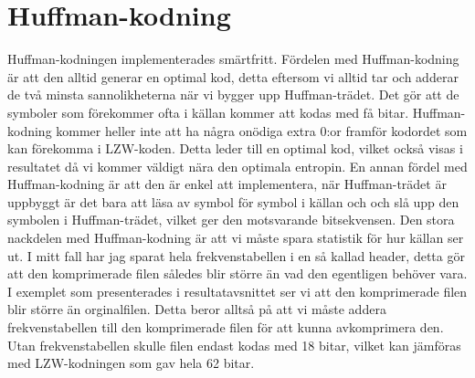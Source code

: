 \section{Huffman-kodning}
Huffman-kodningen implementerades smärtfritt. Fördelen med Huffman-kodning är att den alltid generar en optimal kod, detta eftersom vi alltid tar och adderar de två minsta sannolikheterna när vi bygger upp Huffman-trädet. Det gör att de symboler som förekommer ofta i källan kommer att kodas med få bitar. Huffman-kodning kommer heller inte att ha några onödiga extra 0:or framför kodordet som kan förekomma i LZW-koden. Detta leder till en optimal kod, vilket också visas i resultatet då vi kommer väldigt nära den optimala entropin. En annan fördel med Huffman-kodning är att den är enkel att implementera, när Huffman-trädet är uppbyggt är det bara att läsa av symbol för symbol i källan och och slå upp den symbolen i Huffman-trädet, vilket ger den motsvarande bitsekvensen.
Den stora nackdelen med Huffman-kodning är att vi måste spara statistik för hur källan ser ut. I mitt fall har jag sparat hela frekvenstabellen i en så kallad header, detta gör att den komprimerade filen således blir större än vad den egentligen behöver vara. I exemplet som presenterades i resultatavsnittet ser vi att den komprimerade filen blir större än orginalfilen. Detta beror alltså på att vi måste addera frekvenstabellen till den komprimerade filen för att kunna avkomprimera den. Utan frekvenstabellen skulle filen endast kodas med 18 bitar, vilket kan jämföras med LZW-kodningen som gav hela 62 bitar.


